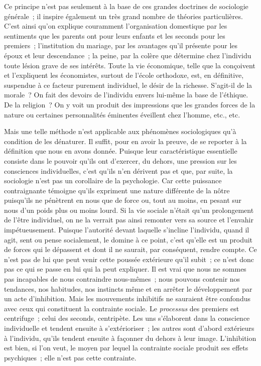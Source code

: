 \documentclass[french,twoside]{book} %
\begin{document}
Ce principe n’est pas seulement à la base de ces grandes doctrines de sociologie générale ; il inspire également un très grand nombre de théories particulières. C’est ainsi qu’on explique couramment l’organisation domestique par les sentiments que les parents ont pour leurs enfants et les seconds pour les premiers ; l’institution du mariage, par les avantages qu’il présente pour les époux et leur descendance ; la peine, par la colère que détermine chez l’individu toute lésion grave de ses intérêts. Toute la vie économique, telle que la conçoivent et l’expliquent les économistes, surtout de l’école orthodoxe, est, en définitive, suspendue à ce facteur purement individuel, le désir de la richesse. S’agit-il de la morale ? On fait des devoirs de l’individu envers lui-même la base de l’éthique. De la religion ? On y voit un produit des impressions que les grandes forces de la nature ou certaines personnalités éminentes éveillent chez l’homme, etc., etc.\par
Mais une telle méthode n’est applicable aux phénomènes sociologiques qu’à condition de les dénaturer. Il suffit, pour en avoir la preuve, de se reporter à la définition que nous en avons donnée. Puisque leur caractéristique essentielle consiste dans le pouvoir qu’ils ont d’exercer, du dehors, une pression sur les consciences individuelles, c’est qu’ils n’en dérivent pas et que, par suite, la sociologie n’est pas un corollaire de la psychologie. Car cette puissance contraignante témoigne qu’ils expriment une nature différente de la nôtre puisqu’ils ne pénètrent en nous que de force ou, tout au moins, en pesant sur nous d’un poids plus ou moins lourd. Si la vie sociale n’était qu’un prolongement de l’être individuel, on ne la verrait pas ainsi remonter vers sa source et l’envahir impétueusement. Puisque l’autorité devant laquelle s’incline l’individu, quand il agit, sent ou pense socialement, le domine à ce point, c’est qu’elle est un produit de forces qui le dépassent et dont il ne saurait, par conséquent, rendre compte. Ce n’est pas de lui que peut venir cette poussée extérieure qu’il subit ; ce n’est donc pas ce qui se passe en lui qui la peut expliquer. Il est vrai que nous ne sommes pas incapables de nous contraindre nous-mêmes ; nous pouvons contenir nos tendances, nos habitudes, nos instincts même et en arrêter le développement par un acte d’inhibition. Mais les mouvements inhibitifs ne sauraient être confondus avec ceux qui constituent la contrainte sociale. Le {\itshape processus} des premiers est centrifuge ; celui des seconds, centripète. Les uns s’élaborent dans la conscience individuelle et tendent ensuite à s’extérioriser ; les autres sont d’abord extérieurs à l’individu, qu’ils tendent ensuite à façonner du dehors à leur image. L’inhibition est bien, si l’on veut, le moyen par lequel la contrainte sociale produit ses effets psychiques ; elle n’est pas cette contrainte.\par
\end{document}
